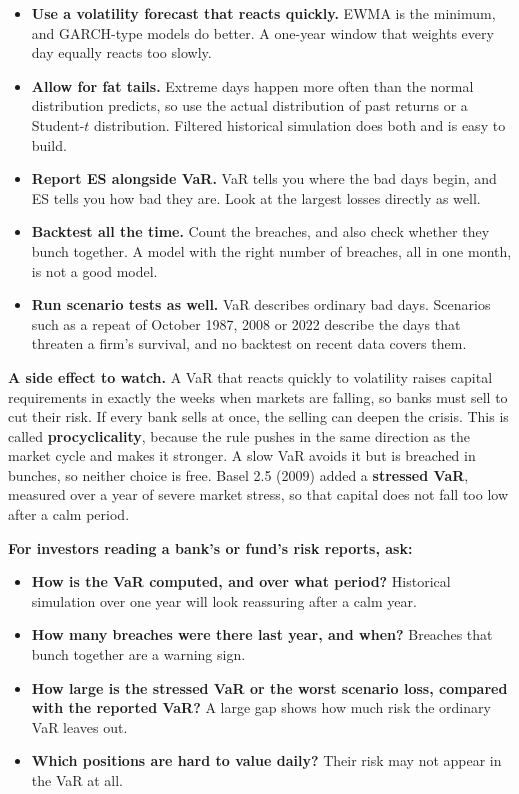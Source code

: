 \begin{itemize}
  \item \textbf{Use a volatility forecast that reacts quickly.} EWMA is the minimum, and GARCH-type models do better. A one-year window that weights every day equally reacts too slowly.
  \item \textbf{Allow for fat tails.} Extreme days happen more often than the normal distribution predicts, so use the actual distribution of past returns or a Student-$t$ distribution. Filtered historical simulation does both and is easy to build.
  \item \textbf{Report ES alongside VaR.} VaR tells you where the bad days begin, and ES tells you how bad they are. Look at the largest losses directly as well.
  \item \textbf{Backtest all the time.} Count the breaches, and also check whether they bunch together. A model with the right number of breaches, all in one month, is not a good model.
  \item \textbf{Run scenario tests as well.} VaR describes ordinary bad days. Scenarios such as a repeat of October 1987, 2008 or 2022 describe the days that threaten a firm's survival, and no backtest on recent data covers them.
\end{itemize}

\textbf{A side effect to watch.} A VaR that reacts quickly to volatility raises capital requirements in exactly the weeks when markets are falling, so banks must sell to cut their risk. If every bank sells at once, the selling can deepen the crisis. This is called \textbf{procyclicality}, because the rule pushes in the same direction as the market cycle and makes it stronger. A slow VaR avoids it but is breached in bunches, so neither choice is free. Basel 2.5 (2009) added a \textbf{stressed VaR}, measured over a year of severe market stress, so that capital does not fall too low after a calm period.

\textbf{For investors reading a bank's or fund's risk reports, ask:}

\begin{itemize}
  \item \textbf{How is the VaR computed, and over what period?} Historical simulation over one year will look reassuring after a calm year.
  \item \textbf{How many breaches were there last year, and when?} Breaches that bunch together are a warning sign.
  \item \textbf{How large is the stressed VaR or the worst scenario loss, compared with the reported VaR?} A large gap shows how much risk the ordinary VaR leaves out.
  \item \textbf{Which positions are hard to value daily?} Their risk may not appear in the VaR at all.
\end{itemize}

